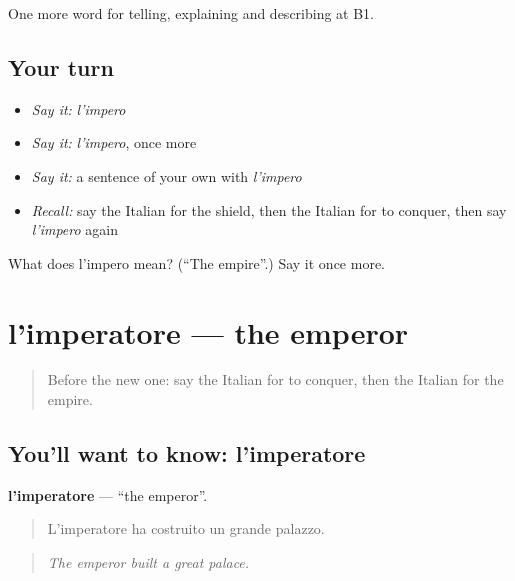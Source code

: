 \begin{grammarlens}[title={What you've built}]
One more word for telling, explaining and describing at B1.
\end{grammarlens}

\subsection*{Your turn}
\begin{itemize}
\raggedright
  \item \emph{Say it:} \emph{l'impero}
  \item \emph{Say it:} \emph{l'impero}, once more
  \item \emph{Say it:} a sentence of your own with \emph{l'impero}
  \item \emph{Recall:} say the Italian for the shield, then the Italian for to conquer, then say \emph{l'impero} again
\end{itemize}

\begin{tcolorbox}[breakable,colback=teal!4,colframe=teal!35!black,title={Before you move on}]
What does l'impero mean? (\textquotedblleft{}The empire\textquotedblright{}.) Say it once more.
\end{tcolorbox}
\section[l'imperatore]{l'imperatore — the emperor}

\label{lesson:IT-C328-imperatore}



\begin{quote}
Before the new one: say the Italian for to conquer, then the Italian for the empire.
\end{quote}

\subsection*{You'll want to know: l'imperatore}
\textbf{l'imperatore} — \textquotedblleft{}the emperor\textquotedblright{}.

\begin{quote}
L'imperatore ha costruito un grande palazzo.
\end{quote}

\begin{quote}
\emph{The emperor built a great palace.}
\end{quote}

